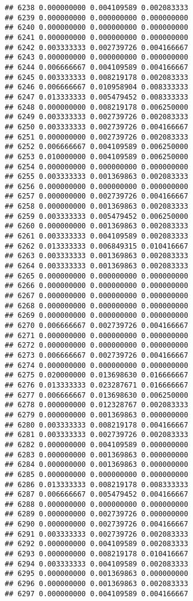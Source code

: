 \documentclass[
]{article}
\begin{document}
\begin{verbatim}
## 6238 0.000000000 0.004109589 0.002083333
## 6239 0.000000000 0.000000000 0.000000000
## 6240 0.000000000 0.000000000 0.000000000
## 6241 0.000000000 0.000000000 0.000000000
## 6242 0.003333333 0.002739726 0.004166667
## 6243 0.000000000 0.000000000 0.000000000
## 6244 0.006666667 0.004109589 0.004166667
## 6245 0.003333333 0.008219178 0.002083333
## 6246 0.006666667 0.010958904 0.008333333
## 6247 0.013333333 0.005479452 0.008333333
## 6248 0.000000000 0.008219178 0.006250000
## 6249 0.003333333 0.002739726 0.002083333
## 6250 0.003333333 0.002739726 0.004166667
## 6251 0.000000000 0.002739726 0.002083333
## 6252 0.006666667 0.004109589 0.006250000
## 6253 0.010000000 0.004109589 0.006250000
## 6254 0.000000000 0.000000000 0.000000000
## 6255 0.003333333 0.001369863 0.002083333
## 6256 0.000000000 0.000000000 0.000000000
## 6257 0.000000000 0.002739726 0.004166667
## 6258 0.000000000 0.001369863 0.002083333
## 6259 0.003333333 0.005479452 0.006250000
## 6260 0.000000000 0.001369863 0.002083333
## 6261 0.003333333 0.004109589 0.002083333
## 6262 0.013333333 0.006849315 0.010416667
## 6263 0.003333333 0.001369863 0.002083333
## 6264 0.003333333 0.001369863 0.002083333
## 6265 0.000000000 0.000000000 0.000000000
## 6266 0.000000000 0.000000000 0.000000000
## 6267 0.000000000 0.000000000 0.000000000
## 6268 0.000000000 0.000000000 0.000000000
## 6269 0.000000000 0.000000000 0.000000000
## 6270 0.006666667 0.002739726 0.004166667
## 6271 0.000000000 0.000000000 0.000000000
## 6272 0.000000000 0.000000000 0.000000000
## 6273 0.006666667 0.002739726 0.004166667
## 6274 0.000000000 0.000000000 0.000000000
## 6275 0.020000000 0.013698630 0.016666667
## 6276 0.013333333 0.023287671 0.016666667
## 6277 0.006666667 0.013698630 0.006250000
## 6278 0.000000000 0.012328767 0.002083333
## 6279 0.000000000 0.001369863 0.000000000
## 6280 0.003333333 0.008219178 0.004166667
## 6281 0.003333333 0.002739726 0.002083333
## 6282 0.000000000 0.004109589 0.000000000
## 6283 0.000000000 0.001369863 0.000000000
## 6284 0.000000000 0.001369863 0.000000000
## 6285 0.000000000 0.000000000 0.000000000
## 6286 0.013333333 0.008219178 0.008333333
## 6287 0.006666667 0.005479452 0.004166667
## 6288 0.000000000 0.000000000 0.000000000
## 6289 0.000000000 0.002739726 0.000000000
## 6290 0.000000000 0.002739726 0.004166667
## 6291 0.003333333 0.002739726 0.002083333
## 6292 0.000000000 0.004109589 0.002083333
## 6293 0.000000000 0.008219178 0.010416667
## 6294 0.003333333 0.004109589 0.002083333
## 6295 0.000000000 0.001369863 0.000000000
## 6296 0.000000000 0.001369863 0.002083333
## 6297 0.000000000 0.004109589 0.004166667

\end{verbatim}
\end{document}
